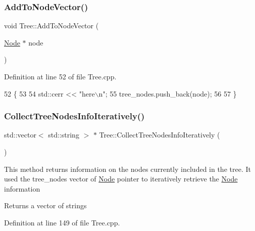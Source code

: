 \subsubsection{\texorpdfstring{Add\+To\+Node\+Vector()}{AddToNodeVector()}}
{\footnotesize\ttfamily void Tree\+::\+Add\+To\+Node\+Vector (\begin{DoxyParamCaption}\item[{\hyperlink{classNode}{Node} $\ast$}]{node }\end{DoxyParamCaption})}



Definition at line 52 of file Tree.\+cpp.


\begin{DoxyCode}
52                                     \{
53   
54   std::cerr << \textcolor{stringliteral}{"here\(\backslash\)n"};
55   tree\_nodes.push\_back(node);
56   
57 \}
\end{DoxyCode}
\mbox{\label{classTree_a9a6309402407a051b346e779169f2ffc}} 
\subsubsection{\texorpdfstring{Collect\+Tree\+Nodes\+Info\+Iteratively()}{CollectTreeNodesInfoIteratively()}}
{\footnotesize\ttfamily std\+::vector$<$ std\+::string $>$ $\ast$ Tree\+::\+Collect\+Tree\+Nodes\+Info\+Iteratively (\begin{DoxyParamCaption}{ }\end{DoxyParamCaption})}

This method returns information on the nodes currently included in the tree. It used the tree\+\_\+nodes vector of \hyperlink{classNode}{Node} pointer to iteratively retrieve the \hyperlink{classNode}{Node} information

\begin{DoxyReturn}{Returns}
a vector of strings 
\end{DoxyReturn}


Definition at line 149 of file Tree.\+cpp.


